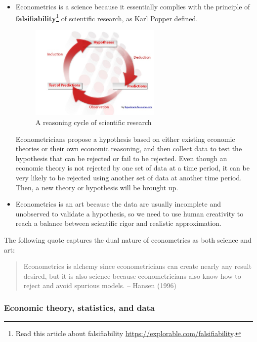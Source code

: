 \documentclass[a4paper,11pt]{article}
\begin{document}
\begin{itemize}
\item Econometrics is a science because it essentially complies with the
principle of \textbf{falsifiability}\footnote{Read this article about falsifiability \url{https://explorable.com/falsifiability}.} of scientific research, as Karl Popper
defined. 

\begin{figure}[htbp]
\centering
\includegraphics[width=0.6\textwidth]{figure/reasoning-cycle-research.jpg}
\caption{\label{fig:orgde010a5}
A reasoning cycle of scientific research}
\end{figure}

Econometricians propose a hypothesis based on either existing economic
theories or their own economic reasoning, and then collect data to
test the hypothesis that can be rejected or fail to be rejected. Even
though an economic theory is not rejected by one set of data at a
time period, it can be very likely to be rejected using another set of
data at another time period. Then, a new theory or hypothesis will
be brought up.

\item Econometrics is an art because the data are usually incomplete and
unobserved to validate a hypothesis, so we need to use human
creativity to reach a balance between scientific rigor and realistic
approximation.
\end{itemize}

The following quote captures the dual nature of econometrics as both
science and art: 
\begin{quote}
Econometrics is alchemy since econometricians can create nearly any
result desired, but it is also science because econometricians also
know how to reject and avoid spurious models. -- Hansen (1996)
\end{quote}


\subsubsection*{Economic theory, statistics, and data}
\label{sec:org26334a9}
\end{document}
